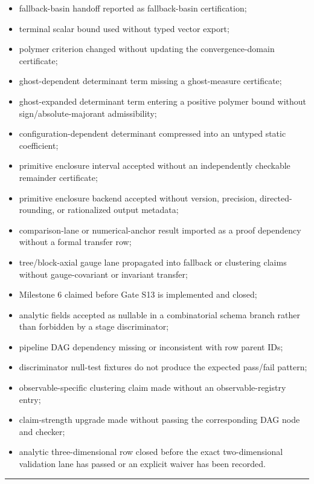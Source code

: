 \documentclass[
]{article}
\begin{document}
\begin{itemize}
\item
  fallback-basin handoff reported as fallback-basin certification;
\item
  terminal scalar bound used without typed vector export;
\item
  polymer criterion changed without updating the convergence-domain
  certificate;
\item
  ghost-dependent determinant term missing a ghost-measure certificate;
\item
  ghost-expanded determinant term entering a positive polymer bound
  without sign/absolute-majorant admissibility;
\item
  configuration-dependent determinant compressed into an untyped static
  coefficient;
\item
  primitive enclosure interval accepted without an independently
  checkable remainder certificate;
\item
  primitive enclosure backend accepted without version, precision,
  directed-rounding, or rationalized output metadata;
\item
  comparison-lane or numerical-anchor result imported as a proof
  dependency without a formal transfer row;
\item
  tree/block-axial gauge lane propagated into fallback or clustering
  claims without gauge-covariant or invariant transfer;
\item
  Milestone 6 claimed before Gate S13 is implemented and closed;
\item
  analytic fields accepted as nullable in a combinatorial schema branch
  rather than forbidden by a stage discriminator;
\item
  pipeline DAG dependency missing or inconsistent with row parent IDs;
\item
  discriminator null-test fixtures do not produce the expected pass/fail
  pattern;
\item
  observable-specific clustering claim made without an
  observable-registry entry;
\item
  claim-strength upgrade made without passing the corresponding DAG node
  and checker;
\item
  analytic three-dimensional row closed before the exact two-dimensional
  validation lane has passed or an explicit waiver has been recorded.
\end{itemize}

\begin{center}\rule{0.5\linewidth}{0.5pt}\end{center}
\end{document}
